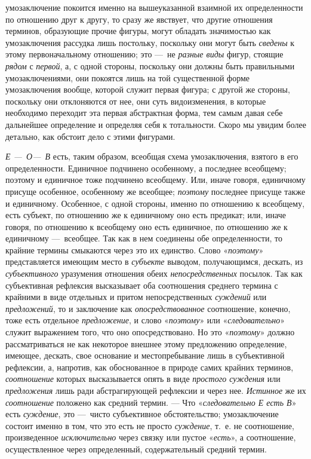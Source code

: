 \documentclass[twoside]{article}
\begin{document}
{{{умозаключение покоится именно на вышеуказанной взаимной их определенности
по отношению друг к другу, то сразу же явствует, что другие отношения
терминов, образующие прочие фигуры, могут обладать значимостью как
умозаключения рассудка лишь постольку, поскольку они могут быть
{\em сведены} к этому
первоначальному отношению; это —~не
{\em разные виды} фигур,
стоящие {\em рядом} с
{\em первой}, а, с одной
стороны, поскольку они должны быть правильными умозаключениями, они
покоятся лишь на той существенной форме умозаключения вообще, которой
служит первая фигура; с другой же стороны, поскольку они отклоняются от
нее, они суть видоизменения, в которые необходимо переходит эта первая
абстрактная форма, тем самым давая себе дальнейшее определение и определяя
себя к тотальности. Скоро мы увидим более детально, как обстоит дело с
этими фигурами.

{\em Е —~О—~В} есть, таким образом, всеобщая схема
умозаключения, взятого в его определенности. Единичное подчинено
особенному, а последнее всеобщему; поэтому и единичное тоже подчинено
всеобщему. Или, иначе говоря, единичному присуще особенное, особенному же
всеобщее; {\em поэтому}
последнее присуще также и единичному. Особенное, с одной
стороны, именно по отношению к всеобщему, есть субъект, по отношению же к
единичному оно есть предикат; или, иначе говоря, по отношению к всеобщему
оно есть единичное, по отношению же к единичному —~всеобщее.
Так как в нем соединены обе определенности, то крайние термины смыкаются
через это их единство. Слово
«{\em поэтому}»
представляется имеющим место в
{\em субъекте} выводом,
получающимся, дескать, из
{\em субъективного}
уразумения отношения обеих
{\em непосредственных}
посылок. Так как субъективная рефлексия высказывает оба
соотношения среднего термина с крайними в виде отдельных и притом
непосредственных {\em суждений}
или {\em предложений},
то и заключение как
{\em опосредствованное}
соотношение, конечно, тоже есть отдельное
{\em предложение}, и
слово «{\em поэтому}» или
«{\em следовательно}»
служит выражением того, что оно опосредствовано. Но это
«{\em поэтому}» должно
рассматриваться не как некоторое внешнее этому предложению определение,
имеющее, дескать, свое основание и местопребывание лишь в субъективной
рефлексии, а, напротив, как обоснованное в природе самих крайних терминов,
{\em соотношение} которых
высказывается опять в виде {\em простого
суждения} или
{\em предложения} лишь
ради абстрагирующей рефлексии и через нее.
{\em Истинное} же их
{\em соотношение}
положено как средний термин. — Что
«{\em следовательно Е есть В}»
есть {\em суждение},
это —~чисто субъективное обстоятельство;
умозаключение состоит именно в том, что это есть не просто
{\em суждение}, т.~е. не
соотношение, произведенное
{\em исключительно} через
связку или пустое «{\em есть}»,
а соотношение, осуществленное через определенный,
содержательный средний термин.

}}}
\end{document}
